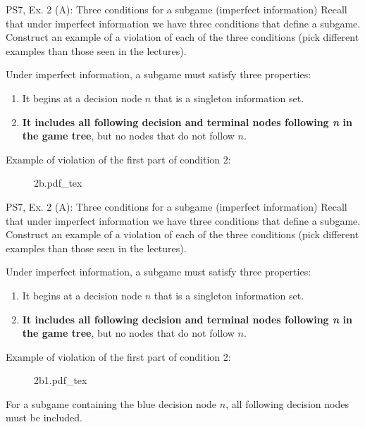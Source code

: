 \begin{frame}{PS7, Ex. 2 (A): Three conditions for a subgame (imperfect information)}
  Recall that under imperfect information we have three conditions that define a subgame. Construct an example of a violation of each of the three conditions (pick different examples than those seen in the lectures).
  \begin{multicols}{2}
    Under imperfect information, a subgame must satisfy three properties:
    \begin{enumerate}
      \item It begins at a decision node $n$ that is a singleton information set.
      \item \textbf{It includes all following decision and terminal nodes following \textit{n} in the game tree}, but no nodes that do not follow $n$.
    \end{enumerate}
    \vfill\null\columnbreak
    Example of violation of the first part of condition 2:
    \vspace{-4pt}
    \begin{figure}[!h]
      \center
      \def\svgwidth{\columnwidth}
      {2b.pdf_tex}
    \end{figure}
    \vfill\null
  \end{multicols}
\end{frame}
\begin{frame}{PS7, Ex. 2 (A): Three conditions for a subgame (imperfect information)}
  Recall that under imperfect information we have three conditions that define a subgame. Construct an example of a violation of each of the three conditions (pick different examples than those seen in the lectures).
  \begin{multicols}{2}
    Under imperfect information, a subgame must satisfy three properties:
    \begin{enumerate}
      \item It begins at a decision node $n$ that is a singleton information set.
      \item \textbf{It includes all following decision and terminal nodes following \textit{n} in the game tree}, but no nodes that do not follow $n$.
    \end{enumerate}
    \vfill\null\columnbreak
    Example of violation of the first part of condition 2:
    \vspace{-20pt}
    \begin{figure}[!h]
      \center
      \def\svgwidth{1.1\columnwidth}
      {2b1.pdf_tex}
    \end{figure}
    For a subgame containing the blue decision node $n$, all following decision nodes must be included.
    \vfill\null
  \end{multicols}
\end{frame}
